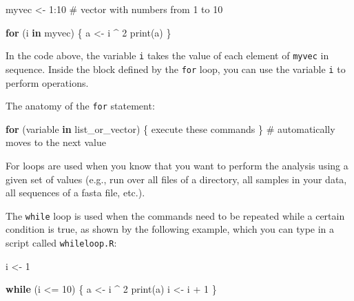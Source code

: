 \documentclass[
  letterpaper,
  DIV=11,
  numbers=noendperiod]{scrreprt}
\newenvironment{Shaded}{\begin{snugshade}}{\end{snugshade}}
\newcommand{\CommentTok}[1]{\textcolor[rgb]{0.37,0.37,0.37}{#1}}
\newcommand{\ControlFlowTok}[1]{\textcolor[rgb]{0.00,0.23,0.31}{\textbf{#1}}}
\newcommand{\DecValTok}[1]{\textcolor[rgb]{0.68,0.00,0.00}{#1}}
\newcommand{\FunctionTok}[1]{\textcolor[rgb]{0.28,0.35,0.67}{#1}}
\newcommand{\NormalTok}[1]{\textcolor[rgb]{0.00,0.23,0.31}{#1}}
\newcommand{\OtherTok}[1]{\textcolor[rgb]{0.00,0.23,0.31}{#1}}
\newcommand{\SpecialCharTok}[1]{\textcolor[rgb]{0.37,0.37,0.37}{#1}}
\begin{document}
\begin{Shaded}
\begin{Highlighting}[]
\NormalTok{myvec }\OtherTok{\textless{}{-}} \DecValTok{1}\SpecialCharTok{:}\DecValTok{10} \CommentTok{\# vector with numbers from 1 to 10}

\ControlFlowTok{for}\NormalTok{ (i }\ControlFlowTok{in}\NormalTok{ myvec) \{}
\NormalTok{  a }\OtherTok{\textless{}{-}}\NormalTok{ i }\SpecialCharTok{\^{}} \DecValTok{2}
  \FunctionTok{print}\NormalTok{(a)}
\NormalTok{\}}
\end{Highlighting}
\end{Shaded}

In the code above, the variable \texttt{i} takes the value of each
element of \texttt{myvec} in sequence. Inside the block defined by the
\texttt{for} loop, you can use the variable \texttt{i} to perform
operations.

The anatomy of the \texttt{for} statement:

\begin{Shaded}
\begin{Highlighting}[]
\ControlFlowTok{for}\NormalTok{ (variable }\ControlFlowTok{in}\NormalTok{ list\_or\_vector) \{}
\NormalTok{  execute these commands}
\NormalTok{\} }\CommentTok{\# automatically moves to the next value}
\end{Highlighting}
\end{Shaded}

For loops are used when you know that you want to perform the analysis
using a given set of values (e.g., run over all files of a directory,
all samples in your data, all sequences of a fasta file, etc.).

The \texttt{while} loop is used when the commands need to be repeated
while a certain condition is true, as shown by the following example,
which you can type in a script called \texttt{whileloop.R}:

\begin{Shaded}
\begin{Highlighting}[]
\NormalTok{i }\OtherTok{\textless{}{-}} \DecValTok{1}

\ControlFlowTok{while}\NormalTok{ (i }\SpecialCharTok{\textless{}=} \DecValTok{10}\NormalTok{) \{}
\NormalTok{  a }\OtherTok{\textless{}{-}}\NormalTok{ i }\SpecialCharTok{\^{}} \DecValTok{2}
  \FunctionTok{print}\NormalTok{(a)}
\NormalTok{  i }\OtherTok{\textless{}{-}}\NormalTok{ i }\SpecialCharTok{+} \DecValTok{1} 
\NormalTok{\}}
\end{Highlighting}
\end{Shaded}
\end{document}
